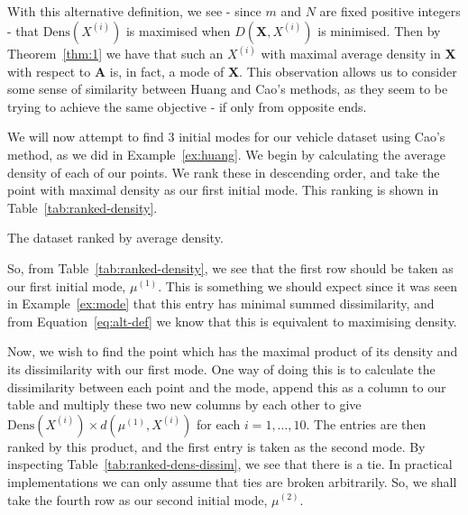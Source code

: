\begin{remark}
    With this alternative definition, we see \-- since \(m\) and \(N\) are fixed
    positive integers \-- that \(\text{Dens}(X^{(i)})\) is maximised when
    \(D(\textbf{X}, X^{(i)})\) is minimised. Then by Theorem~\ref{thm:1} we have
    that such an \(X^{(i)}\) with maximal average density in \textbf{X} with
    respect to \textbf{A} is, in fact, a mode of \textbf{X}. This observation
    allows us to consider some sense of similarity between Huang and Cao's
    methods, as they seem to be trying to achieve the same objective \-- if only
    from opposite ends.
\end{remark}

\begin{example}\label{ex:cao}
    We will now attempt to find \(3\) initial modes for our vehicle dataset 
    using Cao's method, as we did in Example~\ref{ex:huang}. We begin by 
    calculating the average density of each of our points. We rank these in 
    descending order, and take the point with maximal density as our first 
    initial mode. This ranking is shown in Table~\ref{tab:ranked-density}.

    \begin{table}[H]
        \centering
        \singlespacing{%
        \resizebox{.8\textwidth}{!}{%
            
        }}
        \caption{The dataset ranked by average
            density.}\label{tab:ranked-density}
    \end{table}

    So, from Table~\ref{tab:ranked-density}, we see that the first row should be
    taken as our first initial mode, \(\mu^{(1)}\). This is something we should
    expect since it was seen in Example~\ref{ex:mode} that this entry has
    minimal summed dissimilarity, and from Equation~\ref{eq:alt-def} we know
    that this is equivalent to maximising density.
    
    Now, we wish to find the point which has the maximal product of its density
    and its dissimilarity with our first mode. One way of doing this is to 
    calculate the dissimilarity between each point and the mode, append this
    as a column to our table and multiply these two new columns by each other
    to give \(\text{Dens}(X^{(i)}) \times d(\mu^{(1)}, X^{(i)})\) for each \(i =
    1, \ldots, 10\). The entries are then ranked by this product, and the first
    entry is taken as the second mode. By inspecting 
    Table~\ref{tab:ranked-dens-dissim}, we see that there is a tie. In practical
    implementations we can only assume that ties are broken arbitrarily. So, we
    shall take the fourth row as our second initial mode, \(\mu^{(2)}\).


\end{example}
